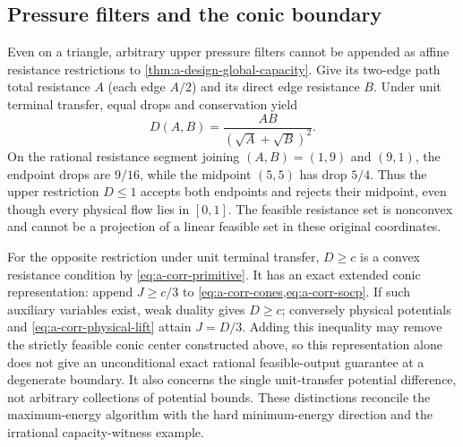 \subsection{Pressure filters and the conic boundary}

Even on a triangle, arbitrary upper pressure filters cannot be appended
as affine resistance restrictions to
\cref{thm:a-design-global-capacity}. Give its two-edge path total
resistance $A$ (each edge $A/2$) and its direct edge resistance $B$.
Under unit terminal transfer, equal drops and conservation yield
\[
 D(A,B)=\frac{AB}{(\sqrt A+\sqrt B)^2}.
\]
On the rational resistance segment joining $(A,B)=(1,9)$ and $(9,1)$,
the endpoint drops are $9/16$, while the midpoint $(5,5)$ has drop
$5/4$. Thus the upper restriction $D\le1$ accepts both endpoints and
rejects their midpoint, even though every physical flow lies in $[0,1]$.
The feasible resistance set is nonconvex and cannot be a projection of
a linear feasible set in these original coordinates.

For the opposite restriction under unit terminal transfer, $D\ge c$ is
a convex resistance condition by \cref{eq:a-corr-primitive}. It has an
exact extended conic representation: append $J\ge c/3$ to
\cref{eq:a-corr-cones,eq:a-corr-socp}. If such auxiliary variables exist,
weak duality gives $D\ge c$; conversely physical potentials and
\cref{eq:a-corr-physical-lift} attain $J=D/3$. Adding this inequality
may remove the strictly feasible conic center constructed above, so
this representation alone does not give an unconditional exact rational
feasible-output guarantee at a degenerate boundary. It also concerns the
single unit-transfer potential difference, not arbitrary collections of
potential bounds. These distinctions reconcile the maximum-energy
algorithm with the hard minimum-energy direction and the irrational
capacity-witness example.
